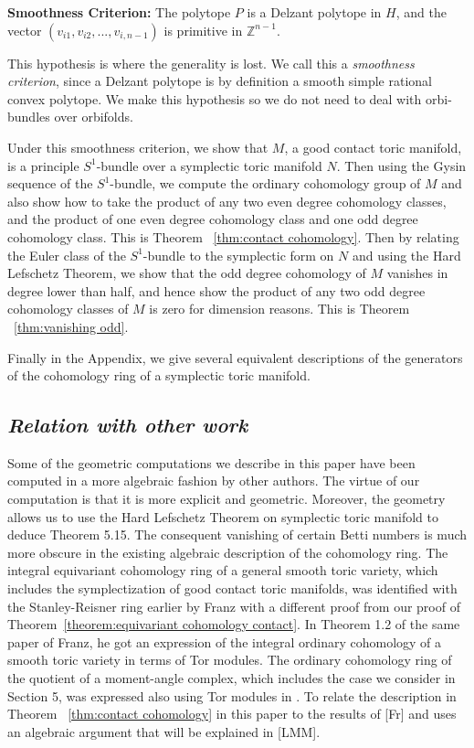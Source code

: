 \documentclass[12pt]{amsart}
\theoremstyle{definition}
\numberwithin{equation}{section}
\begin{document}
{\bf Smoothness Criterion:} The polytope $P$ is a Delzant polytope
in $H$, and the vector $(v_{i1},v_{i2},...,v_{i,n-1})$ is primitive
in ${{\mathbb{Z}}}^{n-1}$.

  This hypothesis is where the
generality is lost. We call this a {\em smoothness criterion}, since
a Delzant polytope is by definition a smooth simple rational convex
polytope. We make this hypothesis so we do not need to deal with
orbi-bundles over orbifolds.

Under this smoothness criterion, we show that $M$, a good contact
toric manifold, is a principle $S^1$-bundle over a symplectic toric
manifold $N$. Then using the Gysin sequence of the $S^1$-bundle, we
compute the ordinary cohomology group of $M$ and also show how to
take the product of any two even degree cohomology classes, and the
product of one even degree cohomology class and one odd degree
cohomology class. This is Theorem ~\ref{thm:contact cohomology}.
Then by relating the Euler class of the $S^1$-bundle to the
symplectic form on $N$ and using the Hard Lefschetz Theorem, we show
that the odd degree cohomology of $M$ vanishes in degree lower than
half, and hence show the product of any two odd degree cohomology
classes of $M$ is zero for dimension reasons. This is Theorem
~\ref{thm:vanishing odd}.

Finally in the Appendix, we give several equivalent descriptions of
the generators of the cohomology ring of a symplectic toric
manifold.
\subsection{\it Relation with other work}

Some of the geometric computations we describe in this paper have
been computed in a more algebraic fashion by other authors. The
virtue of our computation is that it is more explicit and geometric.
Moreover, the geometry allows us to use the Hard Lefschetz Theorem
on symplectic toric manifold to deduce Theorem 5.15. The consequent
vanishing of certain Betti numbers is much more obscure in the
existing algebraic description of the cohomology ring. The integral
equivariant cohomology ring of a general smooth toric variety, which
includes the symplectization of good contact toric manifolds, was
identified with the Stanley-Reisner ring earlier by Franz
\cite[Sec.\ 3]{Franz} with a different proof from our proof of
Theorem~\ref{theorem:equivariant cohomology contact}. In Theorem 1.2
of the same paper of Franz, he got an expression of the integral
ordinary cohomology of a smooth toric variety in terms of Tor
modules. The ordinary cohomology ring of the quotient of a
moment-angle complex, which includes the case we consider in Section
5, was expressed also using Tor modules in \cite[Thm.7.37]{BP}. To
relate the description in Theorem ~\ref{thm:contact cohomology} in
this paper to the results of [Fr] and \cite{BP} uses an algebraic
argument that will be explained in [LMM].
\end{document}
